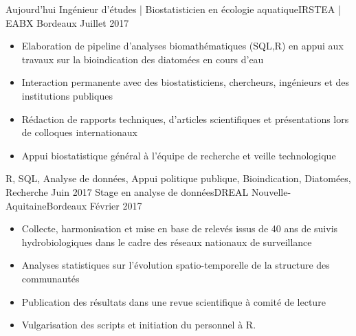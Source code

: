 %
%
%
\begin{experiences}
  \experience
    {Aujourd'hui}   {Ingénieur d'études | Biostatisticien en écologie aquatique}{IRSTEA | EABX }{Bordeaux}
    {Juillet 2017} {
                      \begin{itemize}                    
                        \item Elaboration de pipeline d’analyses biomathématiques (SQL,R) en appui aux travaux sur la bioindication des  diatomées en cours d'eau
                        \item Interaction permanente avec des biostatisticiens, chercheurs, ingénieurs et des institutions publiques 
                        \item Rédaction de rapports techniques, d'articles scientifiques et présentations lors de colloques internationaux
                        \item Appui biostatistique général à l'équipe de recherche et veille technologique                                                                         
                      \end{itemize}
                    }
                    {R, SQL, Analyse de données, Appui politique publique, Bioindication, Diatomées, Recherche}
  \emptySeparator
  \experience
    {Juin 2017} {Stage en analyse de données}{DREAL Nouvelle-Aquitaine}{Bordeaux}
    {Février 2017}    {
                      \begin{itemize}              
                        \item Collecte, harmonisation et mise en base de relevés issus de 40 ans de suivis hydrobiologiques dans le cadre des réseaux nationaux de surveillance               
                        \item Analyses statistiques sur l’évolution spatio-temporelle de la structure des communautés 
                        \item Publication des résultats dans une revue scientifique à comité de lecture    
                        \item Vulgarisation des scripts et initiation du personnel à R.  
                                                

\end{itemize}}
\end{experiences}
